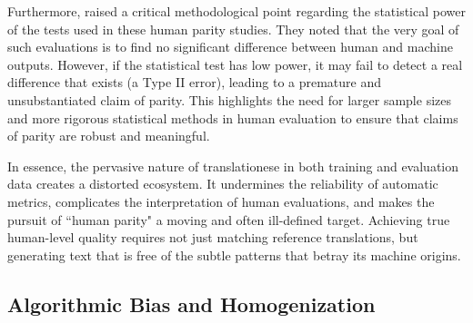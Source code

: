 \documentclass[11pt,a4paper]{article}
\begin{document}
Furthermore, \citet{freitag2019translationese} raised a critical methodological point regarding the statistical power of the tests used in these human parity studies. They noted that the very goal of such evaluations is to find no significant difference between human and machine outputs. However, if the statistical test has low power, it may fail to detect a real difference that exists (a Type II error), leading to a premature and unsubstantiated claim of parity. This highlights the need for larger sample sizes and more rigorous statistical methods in human evaluation to ensure that claims of parity are robust and meaningful.

In essence, the pervasive nature of translationese in both training and evaluation data creates a distorted ecosystem. It undermines the reliability of automatic metrics, complicates the interpretation of human evaluations, and makes the pursuit of ``human parity" a moving and often ill-defined target. Achieving true human-level quality requires not just matching reference translations, but generating text that is free of the subtle patterns that betray its machine origins.

\subsection{Algorithmic Bias and Homogenization}
\end{document}
